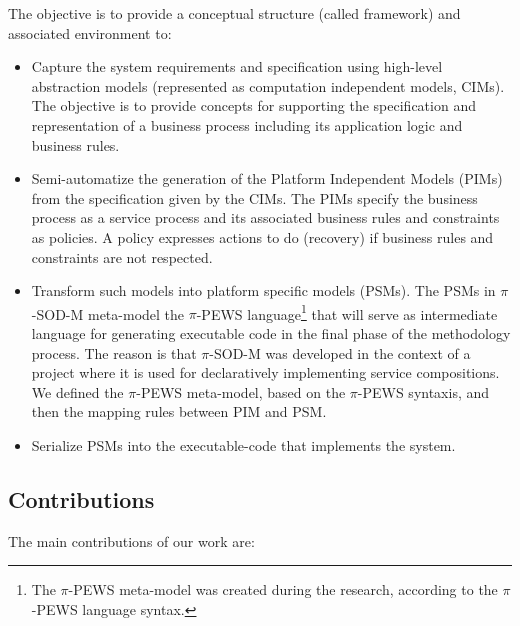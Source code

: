 {The objective is to provide a conceptual structure (called framework)  and
associated environment to:
\begin{itemize}
\item Capture the system requirements and
specification using high-level abstraction models (represented as computation
independent models, CIMs). The objective is to provide concepts for supporting the specification and representation of a business process including its application logic and business rules. 
\item  Semi-automatize the generation of the  Platform Independent Models (PIMs)
from the specification given by the CIMs. The 
PIMs specify the business process as  a service process and its associated business rules  and  constraints as policies.  A policy expresses actions to do (recovery) if business rules and constraints are not respected.
\item Transform such models into platform specific models (PSMs).  The PSMs in
$\pi$-SOD-M meta-model the $\pi$-PEWS language\footnote{The $\pi$-PEWS
meta-model was created during the research, according to the $\pi$-PEWS language
syntax.} \cite{Placido2010LTPD} that will serve as intermediate language for generating executable code in the final phase of the methodology process. The reason is that $\pi$-SOD-M was developed in the context of a project where it is used for declaratively implementing service compositions. We defined the $\pi$-PEWS meta-model, based on the $\pi$-PEWS syntaxis, and then the mapping rules between PIM and PSM.
\item Serialize  PSMs into the executable-code that implements the system. 
\end{itemize}  
 }


\subsection{Contributions}

The main contributions of our work are:
 

